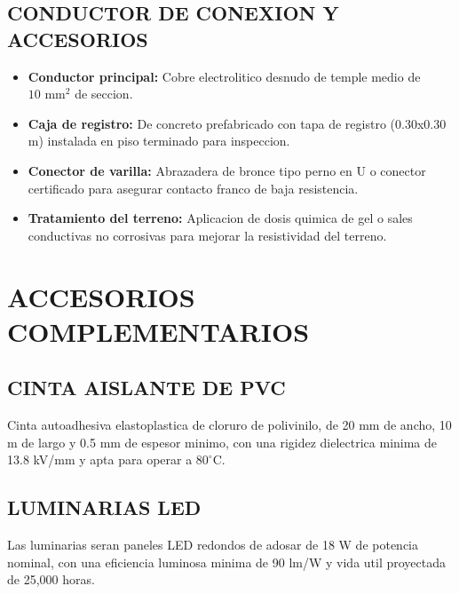 \subsection{CONDUCTOR DE CONEXION Y ACCESORIOS}
\begin{itemize}
  \item \textbf{Conductor principal:} Cobre electrolitico desnudo de temple medio de \(10\text{ mm}^2\) de seccion.
  \item \textbf{Caja de registro:} De concreto prefabricado con tapa de registro (0.30x0.30 m) instalada en piso terminado para inspeccion.
  \item \textbf{Conector de varilla:} Abrazadera de bronce tipo perno en U o conector certificado para asegurar contacto franco de baja resistencia.
  \item \textbf{Tratamiento del terreno:} Aplicacion de dosis quimica de gel o sales conductivas no corrosivas para mejorar la resistividad del terreno.
\end{itemize}

\section{ACCESORIOS COMPLEMENTARIOS}

\subsection{CINTA AISLANTE DE PVC}
Cinta autoadhesiva elastoplastica de cloruro de polivinilo, de 20 mm de ancho, 10 m de largo y 0.5 mm de espesor minimo, con una rigidez dielectrica minima de 13.8 kV/mm y apta para operar a \(80^\circ\text{C}\).

\subsection{LUMINARIAS LED}
Las luminarias seran paneles LED redondos de adosar de 18 W de potencia nominal, con una eficiencia luminosa minima de 90 lm/W y vida util proyectada de 25,000 horas.
